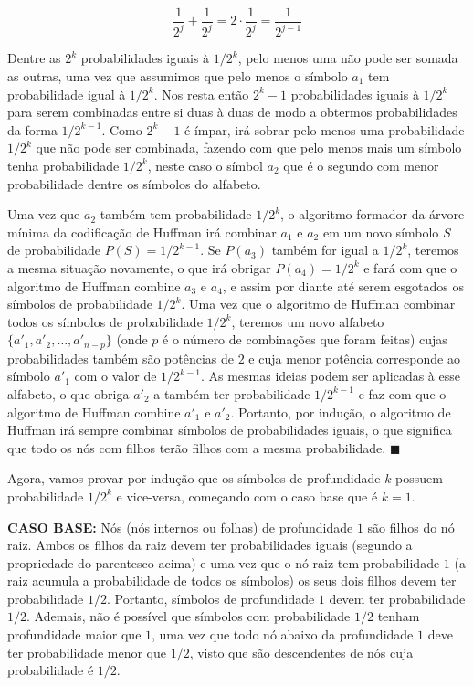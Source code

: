 \documentclass[12pt, a4paper]{article}
\begin{document}
\[ \frac{1}{2^j} + \frac{1}{2^j} = 2 \cdot \frac{1}{2^j} = \frac{1}{2^{j-1}} \]

Dentre as $2^k$ probabilidades iguais à $1/2^k$, pelo menos uma não pode ser somada as outras, uma vez que assumimos que pelo menos o símbolo $a_1$ tem probabilidade igual à $1/2^k$. Nos resta então $2^k - 1$ probabilidades iguais à $1/2^k$ para serem combinadas entre si duas à duas de modo a obtermos probabilidades da forma $1/2^{k-1}$. Como $2^k - 1$ é ímpar, irá sobrar pelo menos uma probabilidade $1/2^k$ que não pode ser combinada, fazendo com que pelo menos mais um símbolo tenha probabilidade $1/2^k$, neste caso o símbol $a_2$ que é o segundo com menor probabilidade dentre os símbolos do alfabeto.

Uma vez que $a_2$ também tem probabilidade $1/2^k$, o algoritmo formador da árvore mínima da codificação de Huffman irá combinar $a_1$ e $a_2$ em um novo símbolo $S$ de probabilidade $P(S)=1/2^{k-1}$. Se $P(a_3)$ também for igual a $1/2^k$, teremos a mesma situação novamente, o que irá obrigar $P(a_4)=1/2^k$ e fará com que o algoritmo de Huffman combine $a_3$ e $a_4$, e assim por diante até serem esgotados os símbolos de probabilidade $1/2^k$. Uma vez que o algoritmo de Huffman combinar todos os símbolos de probabilidade $1/2^k$, teremos um novo alfabeto $\{ a'_1, a'_2, \ldots, a'_{n-p} \}$ (onde $p$ é o número de combinações que foram feitas) cujas probabilidades também são potências de $2$ e cuja menor potência corresponde ao símbolo $a'_1$ com o valor de $1/2^{k-1}$. As mesmas ideias podem ser aplicadas à esse alfabeto, o que obriga $a'_2$ a também ter probabilidade $1/2^{k-1}$ e faz com que o algoritmo de Huffman combine $a'_1$ e $a'_2$. Portanto, por indução, o algoritmo de Huffman irá sempre combinar símbolos de probabilidades iguais, o que significa que todo os nós com filhos terão filhos com a mesma probabilidade. $\blacksquare$

Agora, vamos provar por indução que os símbolos de profundidade $k$ possuem probabilidade $1/2^k$ e vice-versa, começando com o caso base que é $k=1$.

\textbf{CASO BASE:} Nós (nós internos ou folhas) de profundidade $1$ são filhos do nó raiz. Ambos os filhos da raiz devem ter probabilidades iguais (segundo a propriedade do parentesco acima) e uma vez que o nó raiz tem probabilidade $1$ (a raiz acumula a probabilidade de todos os símbolos) os seus dois filhos devem ter probabilidade $1/2$. Portanto, símbolos de profundidade $1$ devem ter probabilidade $1/2$. Ademais, não é possível que símbolos com probabilidade $1/2$ tenham profundidade maior que $1$, uma vez que todo nó abaixo da profundidade $1$ deve ter probabilidade menor que $1/2$, visto que são descendentes de nós cuja probabilidade é $1/2$.
\end{document}
